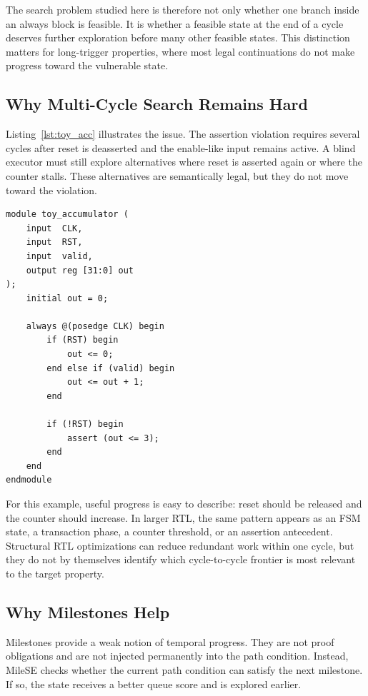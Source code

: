 \documentclass[conference]{IEEEtran}
\begin{document}
The search problem studied here is therefore not only whether one branch inside an always block is feasible. It is whether a feasible state at the end of a cycle deserves further exploration before many other feasible states. This distinction matters for long-trigger properties, where most legal continuations do not make progress toward the vulnerable state.

\subsection{Why Multi-Cycle Search Remains Hard}
Listing~\ref{lst:toy_acc} illustrates the issue. The assertion violation requires several cycles after reset is deasserted and the enable-like input remains active. A blind executor must still explore alternatives where reset is asserted again or where the counter stalls. These alternatives are semantically legal, but they do not move toward the violation.

\begin{lstlisting}[caption={Toy accumulator used to illustrate temporal search difficulty.},label={lst:toy_acc}]
module toy_accumulator (
    input  CLK,
    input  RST,
    input  valid,
    output reg [31:0] out
);
    initial out = 0;

    always @(posedge CLK) begin
        if (RST) begin
            out <= 0;
        end else if (valid) begin
            out <= out + 1;
        end

        if (!RST) begin
            assert (out <= 3);
        end
    end
endmodule
\end{lstlisting}

For this example, useful progress is easy to describe: reset should be released and the counter should increase. In larger RTL, the same pattern appears as an FSM state, a transaction phase, a counter threshold, or an assertion antecedent. Structural RTL optimizations can reduce redundant work within one cycle, but they do not by themselves identify which cycle-to-cycle frontier is most relevant to the target property.

\subsection{Why Milestones Help}
Milestones provide a weak notion of temporal progress. They are not proof obligations and are not injected permanently into the path condition. Instead, MileSE checks whether the current path condition can satisfy the next milestone. If so, the state receives a better queue score and is explored earlier.
\end{document}
